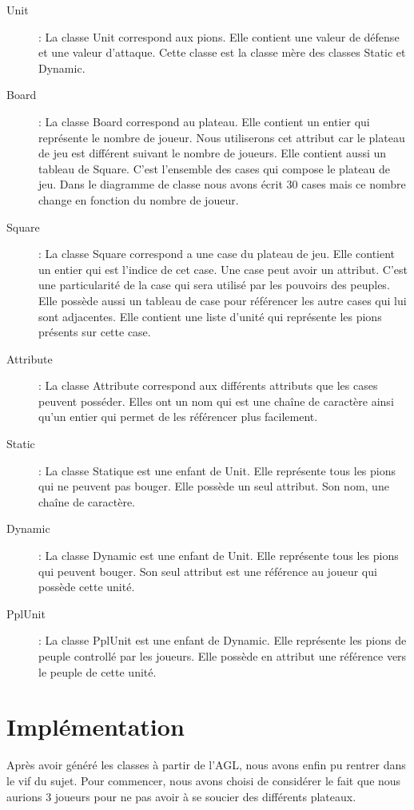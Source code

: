 \documentclass[11pt]{report}
\begin{document}
\begin{description}

\item[Unit] : La classe Unit correspond aux pions. Elle contient une valeur de défense et une valeur d'attaque.  Cette classe est la classe mère des classes Static et Dynamic.

\item[Board] : La classe Board correspond au plateau. Elle contient un entier qui représente le nombre de joueur. Nous utiliserons cet attribut car le plateau de jeu est différent suivant le nombre de joueurs.
Elle contient aussi un tableau de Square. C'est l'ensemble des cases qui compose le plateau de jeu. Dans le diagramme de classe nous avons écrit 30 cases mais ce nombre change en fonction du  nombre de joueur. 

\item[Square] : La classe Square correspond a une case du plateau de jeu. Elle contient un entier qui est l'indice de cet case. Une case peut avoir un attribut. C'est une particularité de la case qui sera utilisé par les pouvoirs des peuples.
Elle possède aussi un tableau de case pour référencer les autre cases qui lui sont adjacentes. Elle contient une liste d'unité qui représente les pions présents sur cette case. 

\item[Attribute] : La classe Attribute correspond aux différents attributs que les cases peuvent posséder. Elles ont un nom qui est une chaîne de caractère ainsi qu'un entier qui permet de les référencer plus facilement.

\item[Static] : La classe Statique est une enfant de Unit. Elle représente tous les pions qui ne peuvent pas bouger. Elle possède un seul attribut. Son nom, une chaîne de caractère.

\item[Dynamic] : La classe Dynamic est une enfant de Unit. Elle représente tous les pions qui peuvent bouger. Son seul attribut est une référence au joueur qui possède cette unité.

\item[PplUnit] : La classe PplUnit est une enfant de Dynamic. Elle représente les pions de peuple controllé par les joueurs. Elle possède en attribut une référence vers le peuple de cette unité.

\end{description}

	\section{Implémentation}
	Après avoir généré les classes à partir de l'AGL, nous avons enfin pu rentrer dans le vif du sujet. Pour commencer, nous avons choisi de considérer le fait que nous aurions 3 joueurs pour ne pas avoir à se soucier des différents plateaux.
	
\end{document}
